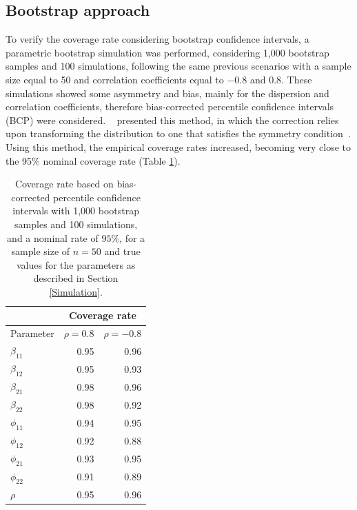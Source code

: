 \documentclass[useAMS,referee]{biom}
\begin{document}
\subsection{Bootstrap approach}
To verify the coverage rate considering bootstrap confidence intervals, a parametric bootstrap simulation was performed, considering 1,000 bootstrap samples and 100 simulations, following the same previous scenarios with a sample size equal to 50 and correlation coefficients equal to $-0.8$ and $0.8$. These simulations showed some asymmetry and bias, mainly
for the dispersion and correlation coefficients, therefore bias-corrected percentile confidence intervals (BCP) were considered. ~\cite{efron1982jackknife} presented this method, in which the correction relies upon transforming the distribution to one that satisfies the symmetry condition~\citep{diciccio1988review,buckland1984monte}. Using this method, the
empirical coverage rates increased, becoming very close to the 95\% nominal coverage rate (Table \ref{table5.4}).


\begin{table}[htb]
\caption{Coverage rate based on bias-corrected percentile confidence intervals with 1,000 bootstrap samples and 100 simulations, and a nominal rate of $95\%$, for a sample size of  $n=50$ and true values for the parameters as described in Section \ref{Simulation}.}
\label{table5.4}
\begin{center}
\begin{tabular}{lrr}
	\hline
	& \multicolumn{2}{c}{Coverage rate} \\
	\hline
	Parameter	& $\rho=0.8$ & $\rho=-0.8$ \\ \hline
	$\beta_{11}$ & 0.95 & 0.96\\ 
	$\beta_{12}$ &  0.95 & 0.93 \\
	
	$\beta_{21}$& 0.98 & 0.96 \\
	
	$\beta_{22}$& 0.98 & 0.92 \\
	
	$\phi_{11}$& 0.94 & 0.95 \\ 
	$\phi_{12}$&  0.92  & 0.88\\
	$\phi_{21}$&  0.93 & 0.95 \\ 
	$\phi_{22}$& 0.91 &0.89 \\
	$\rho$ & 0.95 & 0.96\\
	\hline
\end{tabular}
\end{center}
\end{table}
\end{document}
